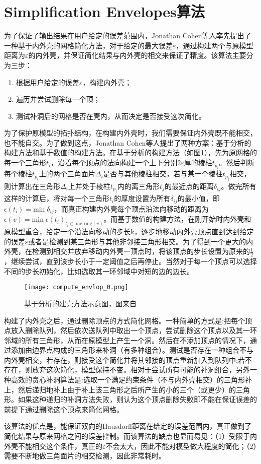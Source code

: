 \section{Simplification Envelopes算法}
为了保证了输出结果在用户给定的误差范围内，Jonathan Cohen等人率先提出了一种基于内外壳的网格简化方法\cite{simp-envlop}，对于给定的最大误差$\varepsilon$，通过构建两个与原模型距离为$\varepsilon$的内外壳，并保证简化结果与内外壳的相交来保证了精度。该算法主要分为三步：
\begin{enumerate}[（1）]
  \item 根据用户给定的误差$\varepsilon$，构建内外壳；
  \item 遍历并尝试删除每一个顶；
  \item 测试补洞后的网格是否在壳内，从而决定是否接受这次简化。
\end{enumerate}
为了保护原模型的拓扑结构，在构建内外壳时，我们需要保证内外壳既不能相交，也不能自交。为了做到这点，Jonathan Cohen等人提出了两种方案：基于分析的构建方法和基于数值的构建方法。在基于分析的构建方法（如图\ref{fig:compute-envlop0}），先为原网格的每一个三角形$t_i$，沿着每个顶点的法向构建一个上下分别$2\varepsilon$厚的棱柱$t_{p_i}$。然后判断每个棱柱$t_{p_i}$上的两个三角面片$\Delta_i$是否与其他棱柱相交，若与某一个棱柱$t_{p_j}$相交，则计算出在三角形$\Delta_i$上并处于棱柱$t_{p_j}$内的离三角形$t_j$的最近点的距离$\delta_{ij}$。做完所有这样的计算后，将对每一个三角形$t_i$的厚度设置为所有$\delta_{ij}$的最小值，即$\epsilon(t_i) = \text{min} \; \delta_{ij}$，而真正构建内外壳每个顶点沿法向移动的距离为$\epsilon(v) = \text{min} \; \epsilon(t_i)_{t_i \in  \text{one\_ring}(v)}$。而基于数值的构建方法，在刚开始时内外壳和原模型重合，给定一个沿法向移动的步长k，逐步地移动内外壳顶点直到达到给定的误差ε或者是检测到某三角形与其他非邻接三角形相交。为了得到一个更大的内外壳，在检测到相交并放弃移动内外壳一顶点时，将该顶点的步长设置为原来的$\frac{1}{2}$，继续尝试，直到该步长小于一定阈值之后再停止。当然对于每一个顶点可以选择不同的步长初始化，比如选取其一环邻域中对短的边的边长。\par
\begin{figure}[htbp]
    \centering
    \texttt{[image: compute\_envlop\_0.png]}
    \caption{基于分析的建壳方法示意图，图来自\cite{simp-envlop}}
    \label{fig:compute-envlop0}
\end{figure}
构建了内外壳之后，通过删除顶点的方式简化网格。一种简单的方式是:把每个顶点放入删除队列，然后依次送队列中取出一个顶点，尝试删除这个顶点以及其一环邻域的所有三角形，从而在原模型上产生一个洞。然后在不添加顶点的情况下，通过添加由边界点构成的三角形来补洞（有多种组合）。测试是否存在一种组合不与内外壳相交，若存在，则接受这个简化并将其邻接的顶点重新加入到队列中;若不存在，则放弃这次简化，模型保持不变。相对于尝试所有可能的补洞组合，另外一种高效的贪心补洞算法是:选取一个满足约束条件（不与内外壳相交）的三角形补上，然后递归地补上由于补上该三角形之后所产生的小的三个（或更少）的三角形。如果这种递归的补洞方法失败，则认为这个顶点删除失败即不能在保证误差的前提下通过删除这个顶点来简化网格。\par
该算法的优点是，能保证双向的Hausdorff距离在给定的误差范围内，真正做到了简化结果与原来网格之间的误差控制。而该算法的缺点也显而易见：（1）受限于内外壳不能相交这个条件，真正的$\varepsilon$不会太大，因此不能对模型做大程度的简化；（2）需要不断地做三角面片的相交检测，因此非常耗时。

